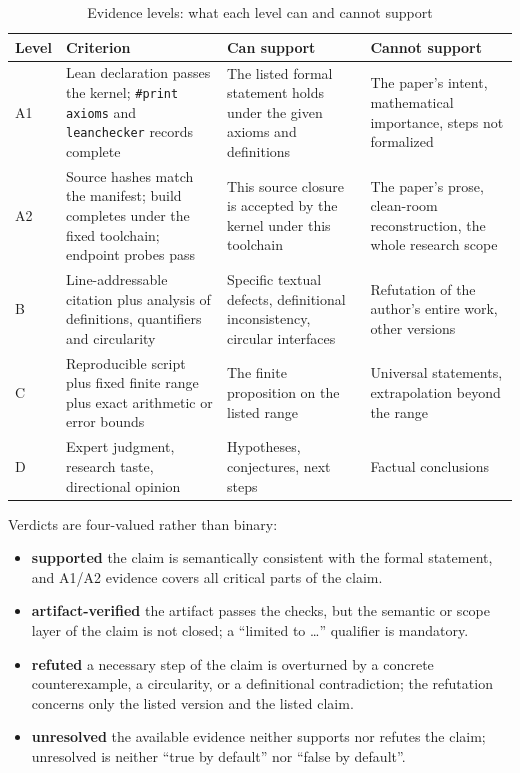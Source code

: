\documentclass[11pt,a4paper]{article}
\theoremstyle{plain}
\theoremstyle{definition}
\newcommand{\Aone}{\textsf{A1}}
\newcommand{\Atwo}{\textsf{A2}}
\newcommand{\Bclass}{\textsf{B}}
\newcommand{\Cclass}{\textsf{C}}
\newcommand{\Dclass}{\textsf{D}}
\begin{document}
\begin{table}[htbp]
\centering
\small
\caption{Evidence levels: what each level can and cannot support}
\label{tab:evidence}
\begin{tabularx}{\textwidth}{@{}>{\raggedright\arraybackslash}p{}
>{\raggedright\arraybackslash}p{}
>{\raggedright\arraybackslash}X
>{\raggedright\arraybackslash}p{}@{}}
\toprule
Level & Criterion & Can support & Cannot support\\
\midrule
\Aone & Lean declaration passes the kernel; \texttt{\#print axioms} and \texttt{leanchecker} records complete & The listed formal statement holds under the given axioms and definitions & The paper's intent, mathematical importance, steps not formalized\\
\addlinespace
\Atwo & Source hashes match the manifest; build completes under the fixed toolchain; endpoint probes pass & This source closure is accepted by the kernel under this toolchain & The paper's prose, clean-room reconstruction, the whole research scope\\
\addlinespace
\Bclass & Line-addressable citation plus analysis of definitions, quantifiers and circularity & Specific textual defects, definitional inconsistency, circular interfaces & Refutation of the author's entire work, other versions\\
\addlinespace
\Cclass & Reproducible script plus fixed finite range plus exact arithmetic or error bounds & The finite proposition on the listed range & Universal statements, extrapolation beyond the range\\
\addlinespace
\Dclass & Expert judgment, research taste, directional opinion & Hypotheses, conjectures, next steps & Factual conclusions\\
\bottomrule
\end{tabularx}
\end{table}

Verdicts are four-valued rather than binary:
\begin{itemize}
\item \textbf{supported} the claim is semantically consistent with the formal statement, and A1/A2 evidence covers all critical parts of the claim.
\item \textbf{artifact-verified} the artifact passes the checks, but the semantic or scope layer of the claim is not closed; a ``limited to \ldots'' qualifier is mandatory.
\item \textbf{refuted} a necessary step of the claim is overturned by a concrete counterexample, a circularity, or a definitional contradiction; the refutation concerns only the listed version and the listed claim.
\item \textbf{unresolved} the available evidence neither supports nor refutes the claim; unresolved is neither ``true by default'' nor ``false by default''.
\end{itemize}
\end{document}
